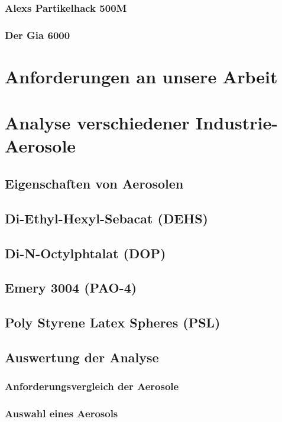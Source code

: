 \subsection{Alexs Partikelhack 500M}
\subsection{Der Gia 6000}


\chapter{Anforderungen an unsere Arbeit}\label{ch:platform}


\chapter{Analyse verschiedener Industrie-Aerosole}\label{ch:work}
\section{Eigenschaften von Aerosolen}
\section{Di-Ethyl-Hexyl-Sebacat (DEHS)}
\section{Di-N-Octylphtalat (DOP)}
\section{Emery 3004 (PAO-4)}
\section{Poly Styrene Latex Spheres (PSL)}
\section{Auswertung der Analyse}
\subsection{Anforderungsvergleich der Aerosole}
\subsection{Auswahl eines Aerosols}

